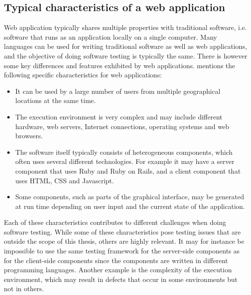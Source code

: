 \MakeShortVerb{\|}

\label{sec:testing_web}

\subsection{Typical characteristics of a web application}

Web application typically shares multiple properties with traditional
software, i.e. software that runs as an application locally on a single
computer. Many languages can be used for writing traditional software as
well as web applications, and the objective of doing software testing is
typically the same. There is however some key differences and features
exhibited by web applications. \citet{book:web} mentions the following
specific characteristics for web applications:\\

\begin{itemize}

\item It can be used by a large number of users from multiple
geographical locations at the same time.

\item The execution environment is very complex and may include
different hardware, web servers, Internet connections, operating systems
and web browsers.

\item The software itself typically consists of heterogeneous
components, which often uses several different technologies. For example
it may have a server component that uses Ruby and Ruby on Rails, and a
client component that uses HTML, CSS and Javascript.

\item Some components, such as parts of the graphical interface, may be
generated at run time depending on user input and the current state of
the application.

\end{itemize}

Each of these characteristics contributes to different challenges when
doing software testing. While some of these characteristics pose
testing issues that are outside the scope of this thesis, others are
highly relevant. It may for instance be impossible to use the same
testing framework for the server-side components as for the client-side
components since the components are written in different programming
languages. Another example is the complexity of the execution
environment, which may result in defects that occur in some environments
but not in others.\\


